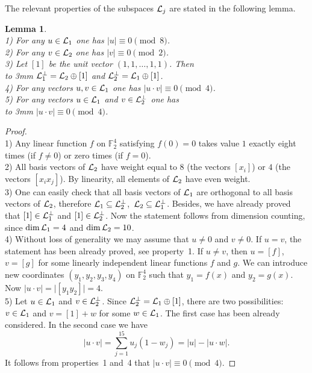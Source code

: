 \documentclass[pra,twocolumn,showpacs]{revtex4}
\newtheorem{lemma}{Lemma}
\newcommand{\FF}{\mathbb{F}}
\newcommand{\calL}{{\cal L }}
\begin{document}
The relevant properties of the subspaces $\calL_j$ are
stated in the following lemma.
\begin{lemma}\label{lemma:weights}
{\mbox{}}\\
1) For any $u \in \calL_1$ one
has $|u|\equiv 0\pmod8$.\\
2) For any  $v\in \calL_2$ one has $|v|\equiv 0\pmod2$.\\
3) Let $[1]$ be the unit vector $(1,1,\ldots,1, 1)$. Then\\ \hbox to 3mm{}
$\calL_1^\perp = \calL_2 \oplus [1]$ and $\calL_2^\perp
= \calL_1 \oplus [1]$.\\
4) For any vectors $u,v \in \calL_1$ one has
$|u\cdot v|\equiv 0\pmod4$.\\
5) For any vectors $u\in\calL_1$ and $v\in \calL_2^\perp$ one has\\
\hbox to 3mm{} 
$|u\cdot v|\equiv 0\pmod4$.
\end{lemma}
\begin{proof} \mbox{} \\
1) Any linear function $f$ on $\FF_2^4$ satisfying $f(0)=0$ takes value $1$
exactly eight times (if $f\ne 0$) or zero times (if $f=0$).\\
2) All basis vectors of $\calL_2$ have weight equal to $8$ (the vectors
$[x_i]$) or $4$ (the vectors $[x_i x_j]$).  By linearity, all elements of
$\calL_2$ have even weight. \\
3) One can easily check that all basis vectors of $\calL_1$ are orthogonal to
all basis vectors of $\calL_2$, therefore $\calL_1\subseteq \calL_2^\perp$,\,
$\calL_2\subseteq \calL_1^\perp$.  Besides, we have already proved that
$[1]\in \calL_1^\perp$ and $[1]\in \calL_2^\perp$. Now the statement follows
from dimension counting, since $\dim{\calL_1}=4$ and $\dim{\calL_2}=10$.\\
4) Without loss of generality we may assume that $u\not=0$ and $v\not=0$. If
$u=v$, the statement has been already proved, see property~1. If $u \ne v$,
then $u=[f]$, $v=[g]$ for some linearly independent linear functions $f$ and
$g$. We can introduce new coordinates $(y_1,y_2,y_3,y_4)$ on $\FF_2^4$ such
that $y_1=f(x)$ and $y_2=g(x)$.  Now $|u\cdot v|=\bigl|[y_1 y_2]\bigr| =4$.\\
5) Let $u\in \calL_1$ and $v\in \calL_2^\perp$. Since $\calL_2^\perp =\calL_1
\oplus [1]$, there are two possibilities: $v\in\calL_1$ and $v=[1]+w$ for some
$w\in \calL_1$. The first case has been already considered. In the second case
we have
\[
|u\cdot v|=\sum_{j=1}^{15} u_j(1-w_j)= |u| - |u\cdot w|.
\]
It follows from properties~1 and~4 that $|u\cdot v|\equiv 0\pmod4$. 
\end{proof}
\end{document}
